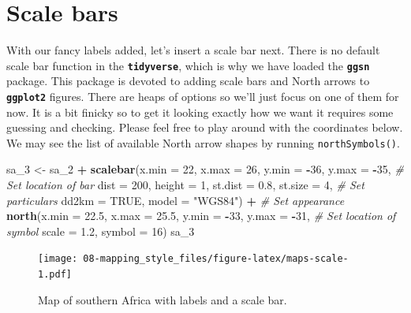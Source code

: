 \documentclass[]{book}
\newenvironment{Shaded}{\begin{snugshade}}{\end{snugshade}}
\newcommand{\KeywordTok}[1]{\textcolor[rgb]{0.13,0.29,0.53}{\textbf{#1}}}
\newcommand{\DataTypeTok}[1]{\textcolor[rgb]{0.13,0.29,0.53}{#1}}
\newcommand{\DecValTok}[1]{\textcolor[rgb]{0.00,0.00,0.81}{#1}}
\newcommand{\FloatTok}[1]{\textcolor[rgb]{0.00,0.00,0.81}{#1}}
\newcommand{\StringTok}[1]{\textcolor[rgb]{0.31,0.60,0.02}{#1}}
\newcommand{\CommentTok}[1]{\textcolor[rgb]{0.56,0.35,0.01}{\textit{#1}}}
\newcommand{\OtherTok}[1]{\textcolor[rgb]{0.56,0.35,0.01}{#1}}
\newcommand{\OperatorTok}[1]{\textcolor[rgb]{0.81,0.36,0.00}{\textbf{#1}}}
\newcommand{\NormalTok}[1]{#1}
\theoremstyle{definition}
\theoremstyle{definition}
\theoremstyle{definition}
\theoremstyle{remark}
\begin{document}
\section{Scale bars}\label{scale-bars}

With our fancy labels added, let's insert a scale bar next. There is no
default scale bar function in the \textbf{\texttt{tidyverse}}, which is
why we have loaded the \textbf{\texttt{ggsn}} package. This package is
devoted to adding scale bars and North arrows to
\textbf{\texttt{ggplot2}} figures. There are heaps of options so we'll
just focus on one of them for now. It is a bit finicky so to get it
looking exactly how we want it requires some guessing and checking.
Please feel free to play around with the coordinates below. We may see
the list of available North arrow shapes by running
\texttt{northSymbols()}.

\begin{Shaded}
\begin{Highlighting}[]
\NormalTok{sa_}\DecValTok{3}\NormalTok{ <-}\StringTok{ }\NormalTok{sa_}\DecValTok{2} \OperatorTok{+}
\StringTok{  }\KeywordTok{scalebar}\NormalTok{(}\DataTypeTok{x.min =} \DecValTok{22}\NormalTok{, }\DataTypeTok{x.max =} \DecValTok{26}\NormalTok{, }\DataTypeTok{y.min =} \OperatorTok{-}\DecValTok{36}\NormalTok{, }\DataTypeTok{y.max =} \OperatorTok{-}\DecValTok{35}\NormalTok{, }\CommentTok{# Set location of bar}
           \DataTypeTok{dist =} \DecValTok{200}\NormalTok{, }\DataTypeTok{height =} \DecValTok{1}\NormalTok{, }\DataTypeTok{st.dist =} \FloatTok{0.8}\NormalTok{, }\DataTypeTok{st.size =} \DecValTok{4}\NormalTok{, }\CommentTok{# Set particulars}
           \DataTypeTok{dd2km =} \OtherTok{TRUE}\NormalTok{, }\DataTypeTok{model =} \StringTok{"WGS84"}\NormalTok{) }\OperatorTok{+}\StringTok{ }\CommentTok{# Set appearance}
\StringTok{  }\KeywordTok{north}\NormalTok{(}\DataTypeTok{x.min =} \FloatTok{22.5}\NormalTok{, }\DataTypeTok{x.max =} \FloatTok{25.5}\NormalTok{, }\DataTypeTok{y.min =} \OperatorTok{-}\DecValTok{33}\NormalTok{, }\DataTypeTok{y.max =} \OperatorTok{-}\DecValTok{31}\NormalTok{, }\CommentTok{# Set location of symbol}
        \DataTypeTok{scale =} \FloatTok{1.2}\NormalTok{, }\DataTypeTok{symbol =} \DecValTok{16}\NormalTok{)}
\NormalTok{sa_}\DecValTok{3}
\end{Highlighting}
\end{Shaded}

\begin{figure}
\centering
\texttt{[image: 08-mapping\_style\_files/figure-latex/maps-scale-1.pdf]}
\caption{\label{fig:maps-scale}Map of southern Africa with labels and a
scale bar.}
\end{figure}
\end{document}

